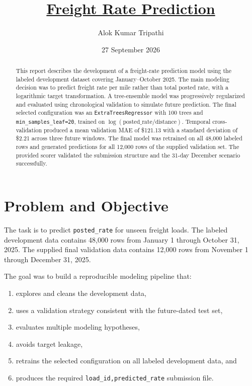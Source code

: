 \documentclass[11pt,a4paper]{article}
\title{\underline{\textbf{Freight Rate Prediction}}
}
\author{Alok Kumar Tripathi}
\date{27 September 2026}
\newcommand{\modelname}{\texttt{ExtraTreesRegressor}}
\begin{document}
\maketitle

\begin{abstract}
This report describes the development of a freight-rate prediction model using the labeled development dataset covering January--October 2025. The main modeling decision was to predict freight rate per mile rather than total posted rate, with a logarithmic target transformation. A tree-ensemble model was progressively regularized and evaluated using chronological validation to simulate future prediction. The final selected configuration was an \modelname{} with 100 trees and \texttt{min\_samples\_leaf=20}, trained on \(\log(\text{posted\_rate}/\text{distance})\). Temporal cross-validation produced a mean validation MAE of \$121.13 with a standard deviation of \$2.21 across three future windows. The final model was retrained on all 48,000 labeled rows and generated predictions for all 12,000 rows of the supplied validation set. The provided scorer validated the submission structure and the 31-day December scenario successfully.
\end{abstract}

\section{Problem and Objective}

The task is to predict \texttt{posted\_rate} for unseen freight loads. The labeled development data contains 48,000 rows from January 1 through October 31, 2025. The supplied final validation data contains 12,000 rows from November 1 through December 31, 2025.

The goal was to build a reproducible modeling pipeline that:
\begin{enumerate}
    \item explores and cleans the development data,
    \item uses a validation strategy consistent with the future-dated test set,
    \item evaluates multiple modeling hypotheses,
    \item avoids target leakage,
    \item retrains the selected configuration on all labeled development data, and
    \item produces the required \texttt{load\_id,predicted\_rate} submission file.
\end{enumerate}
\end{document}
